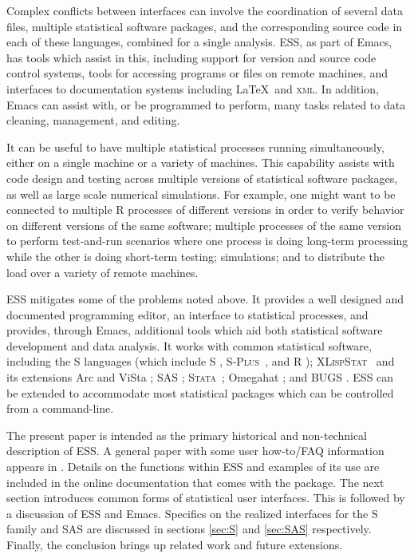 \documentclass{article}
\newcommand*{\Splus}{\textsc{S-Plus}}
\newcommand*{\XLispStat}{\textsc{XLispStat}}
\newcommand*{\Stata}{\textsc{Stata}}
\begin{document}
Complex conflicts between interfaces can involve the coordination of
several data files, multiple statistical software packages, and the
corresponding source code in each of these languages, combined for a
single analysis.  ESS, as part of Emacs, has tools which assist in
this, including support for version and source code control systems,
tools for accessing programs or files on remote machines, and
interfaces to documentation systems including \LaTeX\ and
\textsc{xml}.  In addition, Emacs can assist with, or be programmed to
perform, many tasks related to data cleaning, management, and editing.

It can be useful to have multiple statistical processes running
simultaneously, either on a single machine or a variety of machines.
This capability assists with code design and testing across multiple
versions of statistical software packages, as well as large scale
numerical simulations.  For example, one might want to be connected to
multiple R processes of different versions in order to verify behavior
on different versions of the same software; multiple processes of the
same version to perform test-and-run scenarios where one process is
doing long-term processing while the other is doing short-term
testing; simulations; and to distribute the load over a variety of
remote machines.

ESS mitigates some of the problems noted above.  It provides a well
designed and documented programming editor, an interface to
statistical processes, and provides, through Emacs, additional tools
which aid both statistical software development and data analysis.  It
works with common statistical software, including the S languages
(which include S \citep{BecRCW88,ChaJH92,ChaJ98}, \Splus\ 
\citep{Splus}, and R \citep{ihak:gent:1996}); \XLispStat\ 
\citep{Tier90} and its extensions Arc \citep{Cook:Weisberg:1999} and
ViSta \citep{youn:fald:mcfa:1992}; SAS \citep{SAS:8.0}; \Stata\ 
\citep{Stata:6.0}; Omegahat \citep{DTLang:2000}; and BUGS
\citep{SpieThomBest:1999}.  ESS can be extended to accommodate most
statistical packages which can be controlled from a command-line.

The present paper is intended as the primary historical and
non-technical description of ESS.  A general paper with some user
how-to/FAQ information appears in \citep{heiberger:dsc:2001}.  Details
on the functions within ESS and examples of its use are included in
the online documentation that comes with the package.  The next
section introduces common forms of statistical user interfaces.  This
is followed by a discussion of ESS and Emacs.  Specifics on the
realized interfaces for the S family and SAS are discussed in sections
\ref{sec:S} and \ref{sec:SAS} respectively.  Finally, the conclusion
brings up related work and future extensions.
\end{document}
